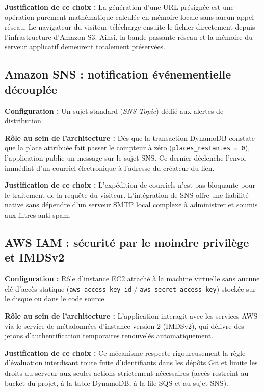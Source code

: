 \textbf{Justification de ce choix :}
La génération d'une URL présignée est une opération purement mathématique calculée en mémoire locale sans aucun appel réseau. Le navigateur du visiteur télécharge ensuite le fichier directement depuis l'infrastructure d'Amazon S3. Ainsi, la bande passante réseau et la mémoire du serveur applicatif demeurent totalement préservées.

\subsection{Amazon SNS : notification événementielle découplée}

\textbf{Configuration :} Un sujet standard (\emph{SNS Topic}) dédié aux alertes de distribution.

\textbf{Rôle au sein de l'architecture :}
Dès que la transaction DynamoDB constate que la place attribuée fait passer le compteur à zéro (\texttt{places\_restantes = 0}), l'application publie un message sur le sujet SNS. Ce dernier déclenche l'envoi immédiat d'un courriel électronique à l'adresse du créateur du lien.

\textbf{Justification de ce choix :}
L'expédition de courriels n'est pas bloquante pour le traitement de la requête du visiteur. L'intégration de SNS offre une fiabilité native sans dépendre d'un serveur SMTP local complexe à administrer et soumis aux filtres anti-spam.

\subsection{AWS IAM : sécurité par le moindre privilège et IMDSv2}

\textbf{Configuration :} Rôle d'instance EC2 attaché à la machine virtuelle sans aucune clé d'accès statique (\texttt{aws\_access\_key\_id} / \texttt{aws\_secret\_access\_key}) stockée sur le disque ou dans le code source.

\textbf{Rôle au sein de l'architecture :}
L'application interagit avec les services AWS via le service de métadonnées d'instance version 2 (IMDSv2), qui délivre des jetons d'authentification temporaires renouvelés automatiquement.

\textbf{Justification de ce choix :}
Ce mécanisme respecte rigoureusement la règle d'évaluation interdisant toute fuite d'identifiants dans les dépôts Git et limite les droits du serveur aux seules actions strictement nécessaires (accès restreint au bucket du projet, à la table DynamoDB, à la file SQS et au sujet SNS).

